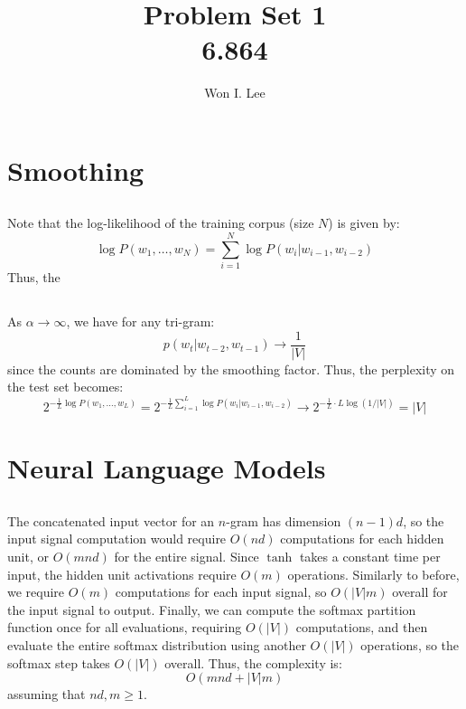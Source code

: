 \documentclass[psamsfonts]{amsart}
\title{Problem Set 1 \\ 6.864}
\author{Won I. Lee}
\theoremstyle{definition}
\theoremstyle{remark}
\numberwithin{equation}{section}
\begin{document}
	
\maketitle

\section{Smoothing}

\subsection{} Note that the log-likelihood of the training corpus (size $N$) is given by:
$$\log P(w_1, \dots, w_N) = \sum_{i=1}^N \log P(w_i|w_{i-1}, w_{i-2})$$
Thus, the 

\subsection{}

\subsection{}

\subsection{} As $\alpha \rightarrow \infty$, we have for any tri-gram:
$$p(w_t|w_{t-2},w_{t-1}) \rightarrow \frac{1}{|V|}$$
since the counts are dominated by the smoothing factor. Thus, the perplexity on the test set becomes:
$$2^{-\frac{1}{L}\log P(w_1, \dots, w_L)} = 2^{-\frac{1}{L}\sum_{i=1}^L \log P(w_i|w_{i-1},w_{i-2})} \rightarrow 2^{-\frac{1}{L}\cdot L \log(1/|V|)} = |V|$$

\section{Neural Language Models}

\subsection{} The concatenated input vector for an $n$-gram has dimension $(n-1)d$, so the input signal computation would require $O(nd)$ computations for each hidden unit, or $O(mnd)$ for the entire signal. Since $\tanh$ takes a constant time per input, the hidden unit activations require $O(m)$ operations. Similarly to before, we require $O(m)$ computations for each input signal, so $O(|V|m)$ overall for the input signal to output. Finally, we can compute the softmax partition function once for all evaluations, requiring $O(|V|)$ computations, and then evaluate the entire softmax distribution using another $O(|V|)$ operations, so the softmax step takes $O(|V|)$ overall. Thus, the complexity is:
$$O(mnd + |V|m)$$
assuming that $nd, m \geq 1$.
\end{document}
